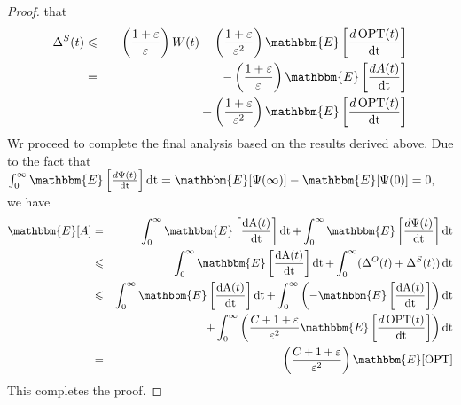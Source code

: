 \documentclass[10pt,conference,compsocconf,letterpaper]{IEEEtran}
\newcommand{\nobracket}{}
\newcommand{\tmop}[1]{\ensuremath{\operatorname{#1}}}
\begin{document}
\begin{proof}
that
\begin{eqnarray}
  \Delta_{}^S (t) & \leqslant & - \left( \frac{1 +
  \varepsilon}{\varepsilon^{}} \right) W (t) + \left( \frac{1 +
  \varepsilon}{\varepsilon^2} \right) \mathbbm{E} \left[ \frac{d \tmop{OPT}
  (t)}{\tmop{dt}} \right] \nonumber\\
  & = & - \left( \frac{1 + \varepsilon}{\varepsilon^{}} \right) \mathbbm{E}
  \left[ \frac{d A (t)}{\tmop{dt}} \right] \nonumber\\
  &  & +^{} \left( \frac{1 + \varepsilon}{\varepsilon^2} \right) \mathbbm{E}
  \left[ \frac{d \tmop{OPT} (t)}{\tmop{dt}} \right]
\end{eqnarray}
Wr proceed to complete the final analysis based on the results derived
above. Due to the fact that $\int_0^{\infty} \mathbbm{E} \left[ \frac{d \Psi
(t)}{\tmop{dt}} \right] \tmop{dt} =\mathbbm{E} [\nobracket \Psi (\infty)]
-\mathbbm{E} [\nobracket \Psi (0)] = 0,$ we have
\begin{eqnarray}
  \mathbbm{E} [A] & = & \int_0^{\infty} \mathbbm{E} \left[ \frac{\tmop{dA}
  (t)}{\tmop{dt}} \right] \tmop{dt} + \int_0^{\infty} \mathbbm{E} \left[
  \frac{d \Psi (t)}{\tmop{dt}} \right] \tmop{dt} \nonumber\\
  & \leqslant & \int_0^{\infty} \mathbbm{E} \left[ \frac{\tmop{dA}
  (t)}{\tmop{dt}} \right] \tmop{dt} + \int_0^{\infty} (\Delta_{}^O (t) +
  \Delta_{}^S (t)) \tmop{dt} \nonumber\\
  & \leqslant & \int_0^{\infty} \mathbbm{E} \left[ \frac{\tmop{dA}
  (t)}{\tmop{dt}} \right] \tmop{dt} + \int_0^{\infty} \left( -\mathbbm{E} \left[ \frac{\tmop{dA}
  (t)}{\tmop{dt}} \right]  \right) \tmop{dt} \nonumber\\
  &  & + \int_0^{\infty} \left( ^{} \frac{C + 1 + \varepsilon}{\varepsilon^2}
  \mathbbm{E} \left[ \frac{d \tmop{OPT} (t)}{\tmop{dt}} \right] \right)
  \tmop{dt} \nonumber\\
  & = & \left( \frac{C + 1 + \varepsilon}{\varepsilon^2} \right) \mathbbm{E}
  [\tmop{OPT}]
\end{eqnarray}
This completes the proof.
\end{proof}
\end{document}
